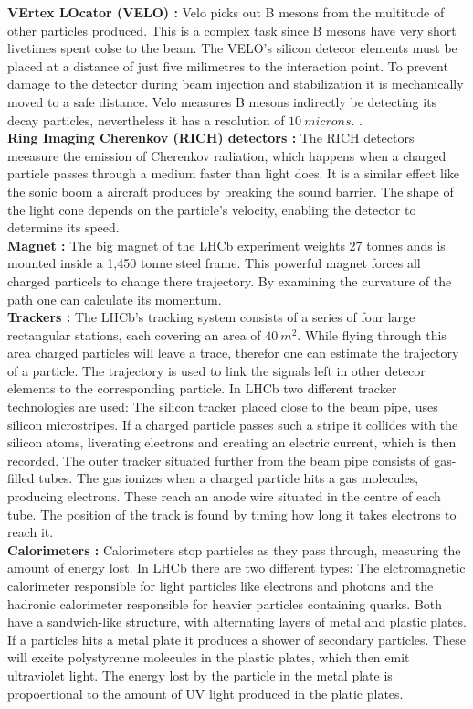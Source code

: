 \documentclass[english]{uzhpub}
\begin{document}
\textbf{VErtex LOcator (VELO) \cite{bib:velo} :} Velo picks out B mesons from the multitude of other particles produced. This is a complex task since B mesons have very short livetimes spent colse to the beam. The VELO's silicon detecor elements must be placed at a distance of just five milimetres to the interaction point. To prevent damage to the detector during beam injection and stabilization it is mechanically moved to a safe distance. Velo measures B mesons indirectly be detecting its decay particles, nevertheless it has a resolution of $\SI{10}{microns}$. . \\
\textbf{Ring Imaging Cherenkov (RICH) detectors \cite{bib:rich} :} The RICH detectors meeasure the emission of Cherenkov radiation, which happens when a charged particle passes through a medium faster than light does. It is a similar effect like the sonic boom a aircraft produces by breaking the sound barrier. The shape of the light cone depends on the particle's velocity, enabling the detector to determine its speed.  \\
\textbf{Magnet \cite{bib:mag} :} The big magnet of the LHCb experiment weights 27 tonnes ands is mounted inside a 1,450 tonne steel frame. This powerful magnet forces all charged particels to change there trajectory. By examining the curvature of the path one can calculate its momentum.  \\
\textbf{Trackers \cite{bib:trac} :} The LHCb's tracking system consists of a series of four large rectangular stations, each covering an area of $\SI{40}{m^2}$. While flying through this area charged particles will leave a trace, therefor one can estimate the trajectory of a particle. The trajectory is used to link the signals left in other detecor elements to the corresponding particle. In LHCb two different tracker technologies are used: The silicon tracker placed close to the beam pipe, uses silicon microstripes. If a charged particle passes such a stripe it collides with the silicon atoms, liverating electrons and creating an electric current, which is then recorded. The outer tracker situated further from the beam pipe consists of gas-filled tubes. The gas ionizes when a charged particle hits a gas molecules, producing electrons. These reach an anode wire situated in the centre of each tube. The position of the track is found by timing how long it takes electrons to reach it. \\
\textbf{Calorimeters \cite{bib:calo} :} Calorimeters stop particles as they pass through, measuring the amount of energy lost. In LHCb there are two different types: The elctromagnetic calorimeter responsible for light particles like electrons and photons and the hadronic calorimeter responsible for heavier particles containing quarks. Both have a sandwich-like structure, with alternating layers of metal and plastic plates. If a particles hits a metal plate it produces a shower of secondary particles. These will excite polystyrenne molecules in the plastic plates, which then emit ultraviolet light. The energy lost by the particle in the metal plate is propoertional to the amount of UV light produced in the platic plates. \\
\end{document}
